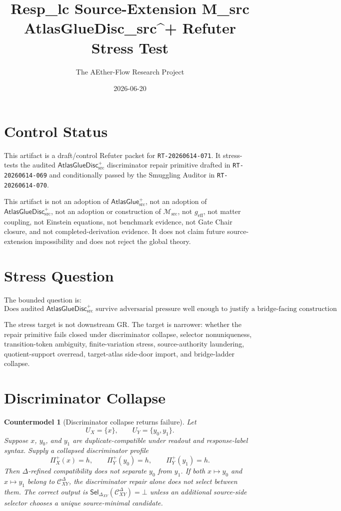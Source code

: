 \documentclass[11pt]{article}
\title{Resp\_lc Source-Extension M\_src AtlasGlueDisc\_src\^{}+ Refuter Stress Test}
\author{The AEther-Flow Research Project}
\date{2026-06-20}
\newcommand{\Msrc}{\mathcal{M}_{\mathrm{src}}}
\newcommand{\geff}{g_{\mathrm{eff}}}
\newcommand{\AtlasGlue}{\mathsf{AtlasGlue}_{\mathrm{src}}^{+}}
\newcommand{\AtlasGlueDisc}{\mathsf{AtlasGlueDisc}_{\mathrm{src}}^{+}}
\newcommand{\Prof}{\Pi^{+}}
\newcommand{\Cand}{\mathcal{C}^{\Delta}}
\newcommand{\Sel}{\mathsf{Sel}_{\Delta}}
\newtheorem{countermodel}{Countermodel}
\begin{document}
\maketitle

\section*{Control Status}

This artifact is a draft/control Refuter packet for
\texttt{RT-20260614-071}. It stress-tests the audited
\(\AtlasGlueDisc\) discriminator repair primitive drafted in
\texttt{RT-20260614-069} and conditionally passed by the Smuggling Auditor in
\texttt{RT-20260614-070}.

This artifact is not an adoption of \(\AtlasGlue\), not an adoption of
\(\AtlasGlueDisc\), not an adoption or construction of \(\Msrc\), not
\(\geff\), not matter coupling, not Einstein equations, not benchmark
evidence, not Gate Chair closure, and not completed-derivation evidence. It
does not claim future source-extension impossibility and does not reject the
global theory.

\section{Stress Question}

The bounded question is:
\[
\text{Does audited }\AtlasGlueDisc\text{ survive adversarial pressure well
enough to justify a bridge-facing construction attempt?}
\]

The stress target is not downstream GR. The target is narrower: whether the
repair primitive fails closed under discriminator collapse, selector
nonuniqueness, transition-token ambiguity, finite-variation stress,
source-authority laundering, quotient-support overread, target-atlas
side-door import, and bridge-ladder collapse.

\section{Discriminator Collapse}

\begin{countermodel}[Discriminator collapse returns failure]
Let
\[
  U_X=\{x\}, \qquad U_Y=\{y_0,y_1\}.
\]
Suppose \(x\), \(y_0\), and \(y_1\) are duplicate-compatible under readout
and response-label syntax. Supply a collapsed discriminator profile
\[
  \Prof_X(x)=h,\qquad \Prof_Y(y_0)=h,\qquad \Prof_Y(y_1)=h.
\]
Then \(\Delta\)-refined compatibility does not separate \(y_0\) from
\(y_1\). If both \(x\mapsto y_0\) and \(x\mapsto y_1\) belong to
\(\Cand_{XY}\), the discriminator repair alone does not select between them.
The correct output is \(\Sel_{XY}(\Cand_{XY})=\bot\) unless an additional
source-side selector chooses a unique source-minimal candidate.
\end{countermodel}
\end{document}
